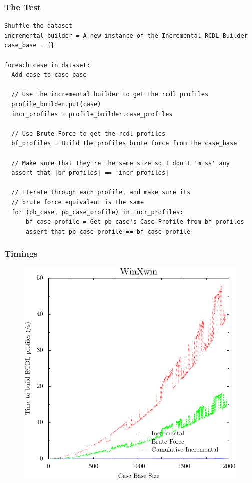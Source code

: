 \documentclass[a4paper,11pt]{report}
\begin{document}
\medspace
\vspace{10pt}

\begin{samepage}
\subsubsection{The Test}
\begin{verbatim}
Shuffle the dataset
incremental_builder = A new instance of the Incremental RCDL Builder
case_base = {}

foreach case in dataset:
  Add case to case_base
  
  // Use the incremental builder to get the rcdl profiles
  profile_builder.put(case)
  incr_profiles = profile_builder.case_profiles
  
  // Use Brute Force to get the rcdl profiles
  bf_profiles = Build the profiles brute force from the case_base
  
  // Make sure that they're the same size so I don't 'miss' any
  assert that |br_profiles| == |incr_profiles|
  
  // Iterate through each profile, and make sure its 
  // brute force equivalent is the same
  for (pb_case, pb_case_profile) in incr_profiles:
      bf_case_profile = Get pb_case's Case Profile from bf_profiles
      assert that pb_case_profile == bf_case_profile
\end{verbatim}

\end{samepage}

\subsubsection{Timings}
\begin{figure}[h!] 
\centering
\includegraphics[width=400pt]{./ExperimentResults/WinXwin_timings_all}
\end{figure}
\end{document}
